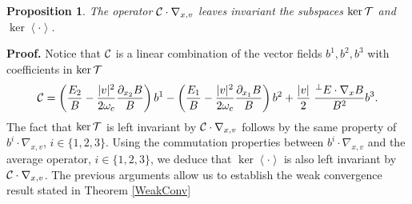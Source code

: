 \documentclass[12pt, a4paper]{article}
\newtheorem{pro}{Proposition}[section]
\newcounter{steps}
\newenvironment{proof}[1][]{%
\par\medbreak\setcounter{steps}{0}
{\noindent\bfseries Proof#1. }} {\hfill\fbox{\ }\medbreak}
\newcommand{\nxv}[0]{
\nabla_{x,v}}
\newcommand{\ave}[1]{
\left \langle #1 \right \rangle }
\begin{document}
\begin{pro}
\label{InvariantSubSpace} The operator ${\cal C} \cdot \nxv $ leaves invariant the subspaces $\ker {\cal T}$ and $\ker \ave{\cdot}$.
\end{pro}
\begin{proof}
Notice that ${\cal C}$ is a linear combination of the vector fields $b^1, b^2, b^3$ with coefficients in $\ker {\cal T}$
\[
{\cal C} = \left ( \frac{E_2}{B} - \frac{|v|^2}{2\omega _c} \frac{\partial _{x_2}B}{B} \right ) b^1 - \left ( \frac{E_1}{B} - \frac{|v|^2}{2\omega _c} \frac{\partial _{x_1}B}{B} \right ) b^2 + \frac{|v|}{2}\;\frac{^\perp E \cdot \nabla _x B}{B^2} b^3.
\]
The fact that $\ker {\cal T}$ is left invariant by ${\cal C} \cdot \nxv$ follows by the same property of $b^i \cdot \nxv$, $i \in \{1,2,3\}$. Using the commutation properties between $b^i \cdot \nxv$ and the average operator, $i \in \{1,2,3\}$, we deduce that $\ker \ave{\cdot}$ is also left invariant by ${\cal C} \cdot \nxv$.
\end{proof}
The previous arguments allow us to establish the weak convergence result stated in Theorem \ref{WeakConv}
\end{document}
